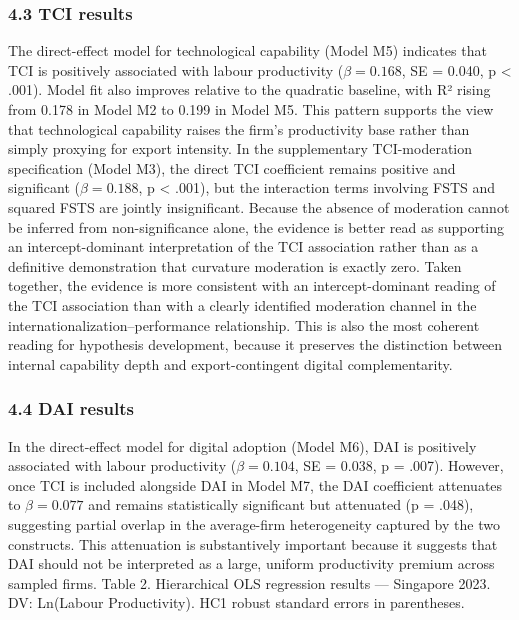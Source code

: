 \documentclass[12pt,a4paper]{article}
\begin{document}
\hypertarget{43-tci-results}{%
\subsubsection{4.3 TCI results}\label{43-tci-results}}

The direct-effect model for technological capability (Model M5)
indicates that TCI is positively associated with labour productivity
(\(\beta = 0.168\), SE = 0.040, p \textless{} .001). Model fit also
improves relative to the quadratic baseline, with R² rising from 0.178
in Model M2 to 0.199 in Model M5. This pattern supports the view that
technological capability raises the firm's productivity base rather than
simply proxying for export intensity. In the supplementary
TCI-moderation specification (Model M3), the direct TCI coefficient
remains positive and significant (\(\beta = 0.188\), p \textless{}
.001), but the interaction terms involving FSTS and squared FSTS are
jointly insignificant. Because the absence of moderation cannot be
inferred from non-significance alone, the evidence is better read as
supporting an intercept-dominant interpretation of the TCI association
rather than as a definitive demonstration that curvature moderation is
exactly zero. Taken together, the evidence is more consistent with an
intercept-dominant reading of the TCI association than with a clearly
identified moderation channel in the internationalization--performance
relationship. This is also the most coherent reading for hypothesis
development, because it preserves the distinction between internal
capability depth and export-contingent digital complementarity.

\hypertarget{44-dai-results}{%
\subsubsection{4.4 DAI results}\label{44-dai-results}}

In the direct-effect model for digital adoption (Model M6), DAI is
positively associated with labour productivity (\(\beta = 0.104\), SE =
0.038, p = .007). However, once TCI is included alongside DAI in Model
M7, the DAI coefficient attenuates to \(\beta = 0.077\) and remains
statistically significant but attenuated (p = .048), suggesting partial
overlap in the average-firm heterogeneity captured by the two
constructs. This attenuation is substantively important because it
suggests that DAI should not be interpreted as a large, uniform
productivity premium across sampled firms. Table 2. Hierarchical OLS
regression results --- Singapore 2023. DV: Ln(Labour Productivity). HC1
robust standard errors in parentheses.
\end{document}
